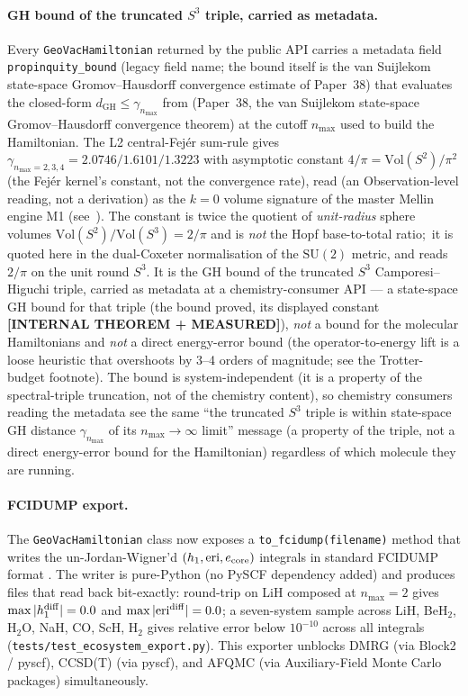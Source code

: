 \documentclass[twocolumn,pra,amsmath,amssymb,superscriptaddress]{revtex4-2}
\begin{document}
\paragraph{GH bound of the truncated $S^3$ triple, carried as metadata.}
Every \texttt{GeoVacHamiltonian} returned by the public API
carries a metadata field \texttt{propinquity\_bound} (legacy field name;
the bound itself is the van Suijlekom state-space Gromov--Hausdorff
convergence estimate of Paper~38) that
evaluates the closed-form
$d_{\mathrm{GH}} \le \gamma_{n_{\max}}$ from
\cite{GeoVac_Paper38} (Paper~38, the van Suijlekom
state-space Gromov--Hausdorff convergence theorem) at the cutoff $n_{\max}$
used to build the Hamiltonian.  The L2 central-Fejér sum-rule
gives $\gamma_{n_{\max}=2,3,4} = 2.0746 / 1.6101 / 1.3223$
with asymptotic constant $4/\pi = \mathrm{Vol}(S^2)/\pi^2$ (the Fej\'er kernel's
constant, not the convergence rate), read (an
Observation-level reading, not a derivation) as the $k = 0$ volume
signature of the master Mellin engine M1 (see~\cite{GeoVac_Paper18}).  The constant is twice the quotient of
\emph{unit-radius} sphere volumes $\mathrm{Vol}(S^2)/\mathrm{Vol}(S^3) = 2/\pi$ and is \emph{not} the Hopf
base-to-total ratio;\ it is quoted here in
the dual-Coxeter normalisation of the $\mathrm{SU}(2)$ metric, and reads
$2/\pi$ on the unit round $S^3$.  It is the GH bound of the truncated
$S^3$ Camporesi--Higuchi triple, carried as metadata at a
chemistry-consumer API --- a state-space GH bound for that triple
(the bound proved, its displayed constant \textbf{[INTERNAL THEOREM + MEASURED]}),
\emph{not} a bound for the molecular Hamiltonians and \emph{not} a direct energy-error bound (the operator-to-energy
lift is a loose heuristic that overshoots by 3--4 orders of magnitude; see
the Trotter-budget footnote).
The bound is system-independent (it is a property of the
spectral-triple truncation, not of the chemistry content),
so chemistry consumers reading the metadata see the same
``the truncated $S^3$ triple is within state-space GH distance
$\gamma_{n_{\max}}$ of its $n_{\max}\to\infty$ limit'' message (a property
of the triple, not a direct energy-error bound for the Hamiltonian) regardless of which molecule they are running.

\paragraph{FCIDUMP export.}  The \texttt{GeoVacHamiltonian}
class now exposes a \texttt{to\_fcidump(filename)} method that
writes the un-Jordan-Wigner'd $(h_1, \mathrm{eri},
e_{\rm core})$ integrals in standard FCIDUMP format
\cite{knowles1989fcidump}.  The writer is pure-Python (no
PySCF dependency added) and produces files that read back
bit-exactly: round-trip on LiH composed at $n_{\max} = 2$
gives $\max|h_1^{\rm diff}| = 0.0$ and
$\max|\mathrm{eri}^{\rm diff}| = 0.0$; a seven-system sample
across LiH, BeH$_2$, H$_2$O, NaH, CO, ScH, H$_2$ gives
relative error below $10^{-10}$ across all integrals
(\texttt{tests/test\_ecosystem\_export.py}).  This
exporter unblocks DMRG (via Block2 / pyscf), CCSD(T) (via
pyscf), and AFQMC (via Auxiliary-Field Monte Carlo packages)
simultaneously.
\end{document}
